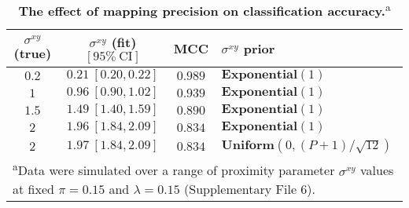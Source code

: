 \begin{table}[]
\caption{\label{tab:proximity} \textbf{The effect of mapping precision on classification accuracy.}\textsuperscript{a}}
\begin{tabular}{cccl}
    \toprule
    $\sigma^{xy}$ (true) & $\sigma^{xy}$ (fit) \: $[95\% \: \text{CI}]$  & MCC & $\sigma^{xy}$ prior \\
    \midrule
    $0.2$ & $0.21 \: [0.20, 0.22]$ & $0.989$ & $\mathbf{Exponential}(1)$ \\
    $1$ & $0.96 \: [0.90, 1.02]$ & $0.939$ & $\mathbf{Exponential}(1)$ \\
    $1.5$ & $1.49 \: [1.40, 1.59]$ & $0.890$ & $\mathbf{Exponential}(1)$ \\
    $2$ & $1.96 \: [1.84, 2.09]$ & $0.834$ & $\mathbf{Exponential}(1)$ \\
    $2$ & $1.97 \: [1.84, 2.09]$ & $0.834$ & $\mathbf{Uniform}(0, (P+1) / \sqrt{12})$ \\
    \bottomrule
    \multicolumn{4}{l}{\footnotesize{\parbox{0.75\textwidth}{\rule{0pt}{3ex}\textsuperscript{a}Data were simulated over a range of proximity parameter $\sigma^{xy}$ values at fixed $\pi=0.15$ and $\lambda=0.15$
    (Supplementary File 6).}}} \\
    \bottomrule
\end{tabular}
\end{table}